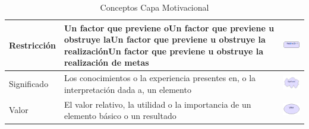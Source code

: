 \begin{table}[h!]
\begin{center}
\begin{tabular}{| m{6em} | m{7cm}| m{3cm} |}
			\\
			\hline
			Restricción 
			& 
			Un factor que previene oUn factor que previene u obstruye laUn factor que previene u obstruye la realizaciónUn factor que previene u obstruye la realización de metas
			& \includegraphics[width=0.8\linewidth, height=0.05\textheight]{imgs/Elementos/Restriccion.PNG}
			\\
			\hline
			Significado 
			& 
			Los conocimientos o la experiencia presentes en, o la interpretación dada a, un elemento
			& \includegraphics[width=0.8\linewidth, height=0.05\textheight]{imgs/Elementos/Significado.PNG}
			\\
			\hline
			Valor 
			& 
			El valor relativo, la utilidad o la importancia de un elemento básico o un resultado
			& \includegraphics[width=0.8\linewidth, height=0.05\textheight]{imgs/Elementos/Valor.PNG}
			\\
			
			\hline
		\end{tabular}
		\caption{Conceptos Capa Motivacional}
		\label{tab:concepts}
	\end{center}
\end{table}